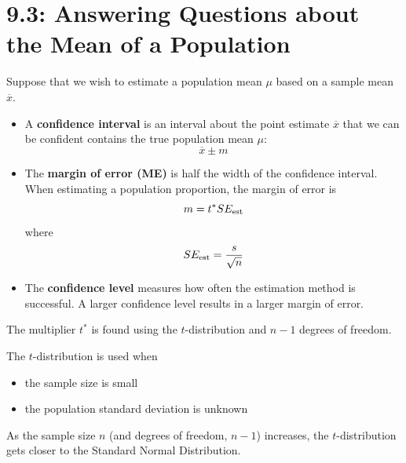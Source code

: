 \documentclass[../mathNotesPreamble]{subfiles}
\providecommand{\relscalefact}{1.4}
\begin{document}
\relscale{\relscalefact}
  \section{9.3: Answering Questions about the Mean of a Population}
    \begin{defn*}
      Suppose that we wish to estimate a population mean $\mu$ based on a sample mean $\overline{x}$.
      \begin{itemize}
        \item A \textbf{confidence interval} is an interval about the point estimate $\overline{x}$ that we can be confident contains the true population mean $\mu$:
          \[\overline{x}\pm m\]
        \item The \textbf{margin of error (ME)} is half the width of the confidence interval. When estimating a population proportion, the margin of error is
          \[m=t^* SE_{\textnormal{est}}\]
          where
          \[SE_{\textnormal{est}}=\frac{s}{\sqrt{n}}\]
        \item The \textbf{confidence level} measures how often the estimation method is successful. A larger confidence level results in a larger margin of error.
      \end{itemize}
    \end{defn*}
    \vspace*{2\baselineskip}

    The multiplier $t^*$ is found using the $t$-distribution and ${n-1}$ degrees of freedom.
    \pagebreak

    The $t$-distribution is used when
    \begin{itemize}
      \item the sample size is small %
      \item the population standard deviation is unknown
    \end{itemize}
    As the sample size $n$ (and degrees of freedom, ${n-1}$) increases, the $t$-distribution gets closer to the Standard Normal Distribution.

    \vspace*{\baselineskip}


\end{document}
